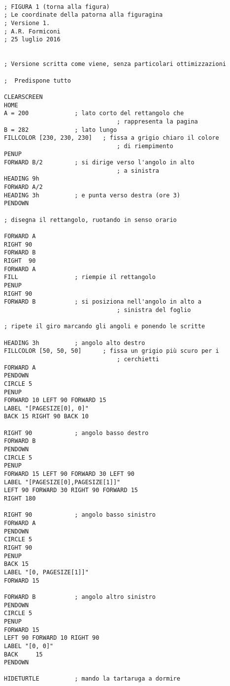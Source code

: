 \lstset{extendedchars=true, basicstyle=\scriptsize} 
\begin{lstlisting}[frame=single]  % Start your code-block

; FIGURA 1 (torna alla figura)
; Le coordinate della patorna alla figuragina
; Versione 1.
; A.R. Formiconi
; 25 luglio 2016


; Versione scritta come viene, senza particolari ottimizzazioni
                                                                
;  Predispone tutto

CLEARSCREEN
HOME
A = 200				; lato corto del rettangolo che 
                                ; rappresenta la pagina
B = 282				; lato lungo
FILLCOLOR [230, 230, 230]	; fissa a grigio chiaro il colore 
                                ; di riempimento
PENUP
FORWARD B/2			; si dirige verso l'angolo in alto 
                                ; a sinistra
HEADING 9h
FORWARD A/2
HEADING 3h			; e punta verso destra (ore 3)
PENDOWN

; disegna il rettangolo, ruotando in senso orario

FORWARD A
RIGHT 90
FORWARD B
RIGHT  90
FORWARD A
FILL				; riempie il rettangolo
PENUP
RIGHT 90
FORWARD B			; si posiziona nell'angolo in alto a 
                                ; sinistra del foglio

; ripete il giro marcando gli angoli e ponendo le scritte 

HEADING 3h			; angolo alto destro
FILLCOLOR [50, 50, 50]		; fissa un grigio più scuro per i 
                                ; cerchietti
FORWARD A
PENDOWN
CIRCLE 5
PENUP
FORWARD 10 LEFT 90 FORWARD 15
LABEL "[PAGESIZE[0], 0]"
BACK 15 RIGHT 90 BACK 10

RIGHT 90			; angolo basso destro
FORWARD B
PENDOWN
CIRCLE 5
PENUP
FORWARD 15 LEFT 90 FORWARD 30 LEFT 90
LABEL "[PAGESIZE[0],PAGESIZE[1]]"
LEFT 90 FORWARD 30 RIGHT 90 FORWARD 15
RIGHT 180

RIGHT 90			; angolo basso sinistro
FORWARD A
PENDOWN
CIRCLE 5
RIGHT 90
PENUP
BACK 15
LABEL "[0, PAGESIZE[1]]"
FORWARD 15

FORWARD B			; angolo altro sinistro
PENDOWN
CIRCLE 5
PENUP
FORWARD 15
LEFT 90 FORWARD 10 RIGHT 90
LABEL "[0, 0]"
BACK	 15
PENDOWN

HIDETURTLE			; mando la tartaruga a dormire

\end{lstlisting}


